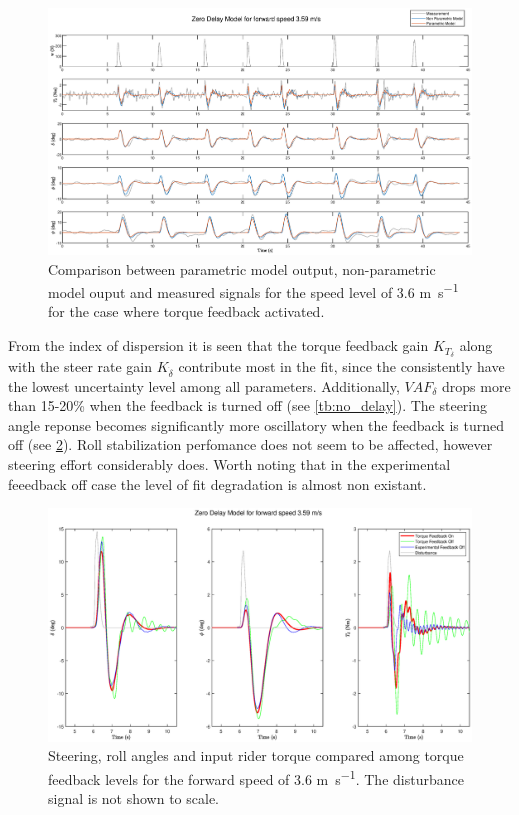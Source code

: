 \begin{figure}[!h]
    \centering
    \captionsetup{justification=centering,margin=2cm}

    \includegraphics[width=\textwidth]{images/no_delay_result1.eps}
    \caption{Comparison between parametric model output, non-parametric model ouput and measured signals for the speed level of 3.6 \si{\meter\per\second} for the case where torque feedback activated.}
    \label{fig:paper5}
\end{figure}


From the index of dispersion it is seen that the torque feedback gain \ensuremath{K_{T_\delta}} along with the steer rate gain \ensuremath{K_{\dot{\delta}}} contribute most in the fit, since the consistently have the lowest uncertainty level among all parameters. Additionally, \ensuremath{\mathit{VAF}_\delta} drops more than 15-20\% when the feedback is turned off (see \cref{tb:no_delay}). The steering angle reponse   becomes significantly more oscillatory when the feedback is turned off (see \cref{fig:paper6}). Roll stabilization perfomance does not seem to be affected, however steering effort considerably does. Worth noting that in the experimental feeedback off case the level of fit degradation is almost non existant.

\begin{figure}[!h]
    \centering
    \captionsetup{justification=centering,margin=2cm}

    \includegraphics[width=\textwidth]{images/no_delay_fb_compare.eps}
    \caption{Steering, roll angles and input rider torque compared among torque feedback levels  for the forward speed of 3.6 \si{\meter\per\second}. The disturbance signal is not shown  to scale.}
    \label{fig:paper6}
\end{figure}



